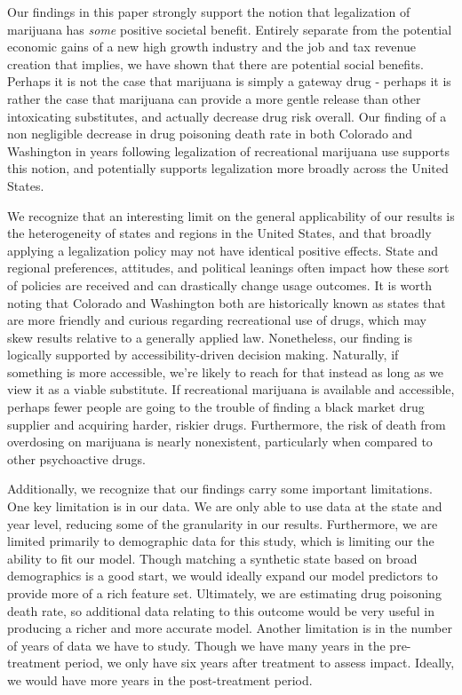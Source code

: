 \documentclass{article}
\begin{document}
Our findings in this paper strongly support the notion that legalization of marijuana has \emph{some} positive societal benefit. Entirely separate from the potential economic gains of a new high growth industry and the job and tax revenue creation that implies, we have shown that there are potential social benefits. Perhaps it is not the case that marijuana is simply a gateway drug - perhaps it is rather the case that marijuana can provide a more gentle release than other intoxicating substitutes, and actually decrease drug risk overall. Our finding of a non negligible decrease in drug poisoning death rate in both Colorado and Washington in years following legalization of recreational marijuana use supports this notion, and potentially supports legalization more broadly across the United States.

We recognize that an interesting limit on the general applicability of our results is the heterogeneity of states and regions in the United States, and that broadly applying a legalization policy may not have identical positive effects. State and regional preferences, attitudes, and political leanings often impact how these sort of policies are received and can drastically change usage outcomes. It is worth noting that Colorado and Washington both are historically known as states that are more friendly and curious regarding recreational use of drugs, which may skew results relative to a generally applied law. Nonetheless, our finding is logically supported by accessibility-driven decision making. Naturally, if something is more accessible, we're likely to reach for that instead as long as we view it as a viable substitute. If recreational marijuana is available and accessible, perhaps fewer people are going to the trouble of finding a black market drug supplier and acquiring harder, riskier drugs. Furthermore, the risk of death from overdosing on marijuana is nearly nonexistent, particularly when compared to other psychoactive drugs.

Additionally, we recognize that our findings carry some important limitations. One key limitation is in our data. We are only able to use data at the state and year level, reducing some of the granularity in our results. Furthermore, we are limited primarily to demographic data for this study, which  is limiting our the ability to fit our model. Though matching a synthetic state based on broad demographics is a good start, we would ideally expand our model predictors to provide more of a rich feature set. Ultimately, we are estimating drug poisoning death rate, so additional data relating to this outcome would be very useful in producing a richer and more accurate model. Another limitation is in the number of years of data we have to study. Though we have many years in the pre-treatment period, we only have six years after treatment to assess impact. Ideally, we would have more years in the post-treatment period.
\end{document}
